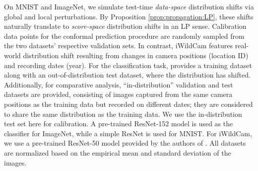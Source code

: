 \documentclass[11pt,a4paper]{article}
\begin{document}
On MNIST and ImageNet, we simulate test-time \textit{data-space} distribution shifts via global and local perturbations. By Proposition \ref{prop:propagation:LP}, these shifts naturally translate to \textit{score-space} distribution shifts in an LP sense. Calibration data points for the conformal prediction procedure are randomly sampled from the two datasets' respective validation sets. In contrast, iWildCam features real-world distribution shift resulting from changes in camera positions (location ID) and recording dates (year). For the classification task, \cite{Koh_2021} provides a training dataset along with an out-of-distribution test dataset, where the distribution has shifted. Additionally, for comparative analysis, ``in-distribution'' validation and test datasets are provided, consisting of images captured from the same camera positions as the training data but recorded on different dates; they are considered to share the same distribution as the training data. We use the in-distribution test set here for calibration. A pre-trained ResNet-152 model is used as the classifier for ImageNet, while a simple ResNet is used for MNIST. For iWildCam, we use a pre-trained ResNet-50 model provided by the authors of \cite{Beery_2020}. All datasets are normalized based on the empirical mean and standard deviation of the images.
\end{document}

